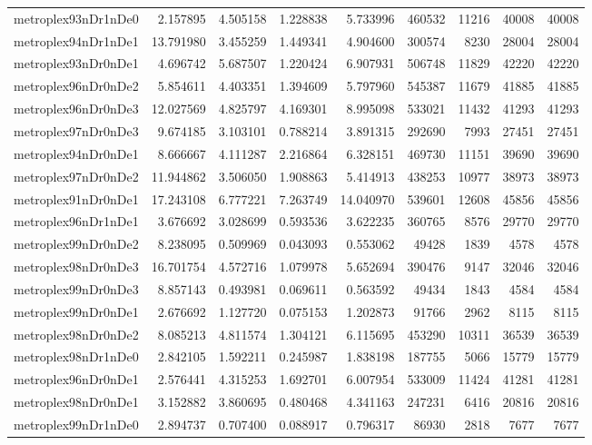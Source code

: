\begin{longtable}{|l|r|r|r|r|r|r|r|r|}
metroplex93nDr1nDe0 & 2.157895 & 4.505158 & 1.228838 & 5.733996 & 460532 & 11216 & 40008 & 40008 \\
metroplex94nDr1nDe1 & 13.791980 & 3.455259 & 1.449341 & 4.904600 & 300574 & 8230 & 28004 & 28004 \\
metroplex93nDr0nDe1 & 4.696742 & 5.687507 & 1.220424 & 6.907931 & 506748 & 11829 & 42220 & 42220 \\
metroplex96nDr0nDe2 & 5.854611 & 4.403351 & 1.394609 & 5.797960 & 545387 & 11679 & 41885 & 41885 \\
metroplex96nDr0nDe3 & 12.027569 & 4.825797 & 4.169301 & 8.995098 & 533021 & 11432 & 41293 & 41293 \\
metroplex97nDr0nDe3 & 9.674185 & 3.103101 & 0.788214 & 3.891315 & 292690 & 7993 & 27451 & 27451 \\
metroplex94nDr0nDe1 & 8.666667 & 4.111287 & 2.216864 & 6.328151 & 469730 & 11151 & 39690 & 39690 \\
metroplex97nDr0nDe2 & 11.944862 & 3.506050 & 1.908863 & 5.414913 & 438253 & 10977 & 38973 & 38973 \\
metroplex91nDr0nDe1 & 17.243108 & 6.777221 & 7.263749 & 14.040970 & 539601 & 12608 & 45856 & 45856 \\
metroplex96nDr1nDe1 & 3.676692 & 3.028699 & 0.593536 & 3.622235 & 360765 & 8576 & 29770 & 29770 \\
metroplex99nDr0nDe2 & 8.238095 & 0.509969 & 0.043093 & 0.553062 & 49428 & 1839 & 4578 & 4578 \\
metroplex98nDr0nDe3 & 16.701754 & 4.572716 & 1.079978 & 5.652694 & 390476 & 9147 & 32046 & 32046 \\
metroplex99nDr0nDe3 & 8.857143 & 0.493981 & 0.069611 & 0.563592 & 49434 & 1843 & 4584 & 4584 \\
metroplex99nDr0nDe1 & 2.676692 & 1.127720 & 0.075153 & 1.202873 & 91766 & 2962 & 8115 & 8115 \\
metroplex98nDr0nDe2 & 8.085213 & 4.811574 & 1.304121 & 6.115695 & 453290 & 10311 & 36539 & 36539 \\
metroplex98nDr1nDe0 & 2.842105 & 1.592211 & 0.245987 & 1.838198 & 187755 & 5066 & 15779 & 15779 \\
metroplex96nDr0nDe1 & 2.576441 & 4.315253 & 1.692701 & 6.007954 & 533009 & 11424 & 41281 & 41281 \\
metroplex98nDr0nDe1 & 3.152882 & 3.860695 & 0.480468 & 4.341163 & 247231 & 6416 & 20816 & 20816 \\
metroplex99nDr1nDe0 & 2.894737 & 0.707400 & 0.088917 & 0.796317 & 86930 & 2818 & 7677 & 7677 \\

\end{longtable}
